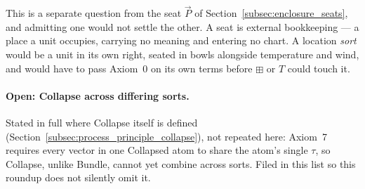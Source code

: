 \documentclass[12pt, a4paper]{article}
\begin{document}
This is a separate question from the seat $\vec P$ of
Section~\ref{subsec:enclosure_seats}, and admitting one would not
settle the other. A seat is external bookkeeping --- a place a unit
occupies, carrying no meaning and entering no chart. A location
\emph{sort} would be a unit in its own right, seated in bowls
alongside temperature and wind, and would have to pass Axiom~0 on its
own terms before $\boxplus$ or $T$ could touch it.

\paragraph{Open: Collapse across differing sorts.} Stated in full
where Collapse itself is defined
(Section~\ref{subsec:process_principle_collapse}), not repeated here:
Axiom~7 requires every vector in one Collapsed atom to share the
atom's single $\tau$, so Collapse, unlike Bundle, cannot yet combine
across sorts. Filed in this list so this roundup does not silently
omit it.
\end{document}

